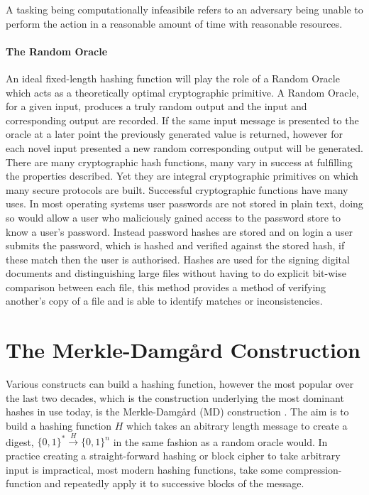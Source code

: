 \documentclass[a4paper,12pt]{article}
\begin{document}
A tasking being computationally infeasibile refers to an adversary being unable to perform the action in a reasonable amount of time with reasonable resources.

\label{sec:propeties_of_a_hash}

\paragraph{The Random Oracle} An ideal fixed-length hashing function will play the role of a Random Oracle which  acts as a theoretically optimal cryptographic primitive. A Random Oracle, for a given input, produces a truly random output and the input and corresponding output are recorded. If the same input message is presented to the oracle at a later point the previously generated value is returned, however for each novel input presented a new random corresponding output will be generated.\\



There are many cryptographic hash functions, many vary in success at fulfilling the properties described. Yet they are integral cryptographic primitives on which many secure protocols are built. Successful cryptographic functions have many uses. In most operating systems user passwords are not stored in plain text, doing so would allow a user who maliciously gained access to the password store to know a user's password. Instead password hashes are stored and on login a user submits the password, which is hashed and verified against the stored hash, if these match then the user is authorised. Hashes are used for the signing digital documents and distinguishing large files without having to do explicit bit-wise comparison between each file, this method provides a method of verifying another's copy of a file and is able to identify matches or inconsistencies.

\section{The Merkle-Damg\r{a}rd Construction}
Various constructs can build a hashing function, however the most popular over the last two decades, which is the construction underlying the most dominant hashes in use today, is the Merkle-Damg\r{a}rd (MD) construction \cite{Merkle1979}.
The aim is to build a hashing function $H$ which takes an abitrary length message to create a digest, $\{0,1\}^* \xrightarrow{H} \{0,1\}^n$ in the same fashion as a random oracle would. In practice creating a straight-forward hashing or block cipher to take arbitrary input is impractical, most modern hashing functions, take some compression-function and repeatedly apply it to successive blocks of the message.
\end{document}
